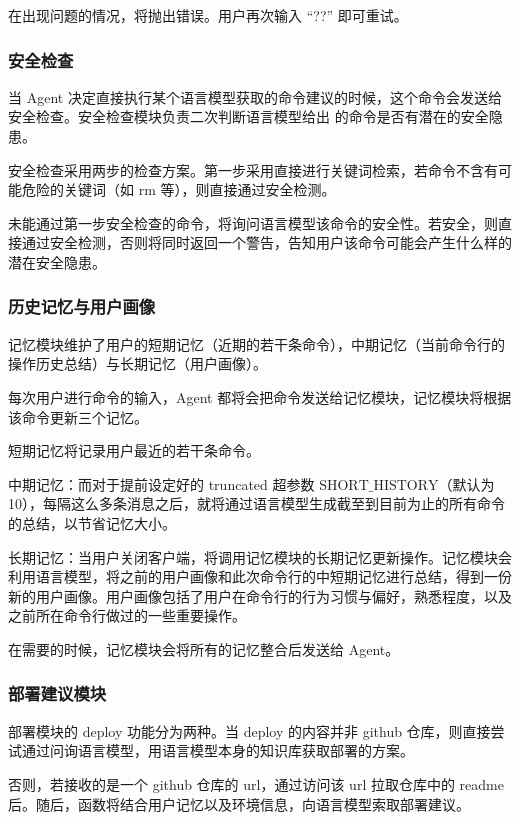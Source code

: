 \documentclass{article}
\theoremstyle{plain}
\theoremstyle{definition}
\theoremstyle{remark}
\begin{document}
在出现问题的情况，将抛出错误。用户再次输入 “??” 即可重试。

\subsubsection{安全检查}

当 Agent 决定直接执行某个语言模型获取的命令建议的时候，这个命令会发送给安全检查。安全检查模块负责二次判断语言模型给出 的命令是否有潜在的安全隐患。

安全检查采用两步的检查方案。第一步采用直接进行关键词检索，若命令不含有可能危险的关键词（如 rm 等），则直接通过安全检测。

未能通过第一步安全检查的命令，将询问语言模型该命令的安全性。若安全，则直接通过安全检测，否则将同时返回一个警告，告知用户该命令可能会产生什么样的潜在安全隐患。

\subsubsection{历史记忆与用户画像}

记忆模块维护了用户的短期记忆（近期的若干条命令），中期记忆（当前命令行的操作历史总结）与长期记忆（用户画像）。

每次用户进行命令的输入，Agent 都将会把命令发送给记忆模块，记忆模块将根据该命令更新三个记忆。

短期记忆将记录用户最近的若干条命令。

中期记忆：而对于提前设定好的 truncated 超参数 $\text{SHORT\_HISTORY}$（默认为 10），每隔这么多条消息之后，就将通过语言模型生成截至到目前为止的所有命令的总结，以节省记忆大小。

长期记忆：当用户关闭客户端，将调用记忆模块的长期记忆更新操作。记忆模块会利用语言模型，将之前的用户画像和此次命令行的中短期记忆进行总结，得到一份新的用户画像。用户画像包括了用户在命令行的行为习惯与偏好，熟悉程度，以及之前所在命令行做过的一些重要操作。

在需要的时候，记忆模块会将所有的记忆整合后发送给 Agent。

\subsubsection{部署建议模块}

部署模块的 deploy 功能分为两种。当 deploy 的内容并非 github 仓库，则直接尝试通过问询语言模型，用语言模型本身的知识库获取部署的方案。

否则，若接收的是一个 github 仓库的 url，通过访问该 url 拉取仓库中的 readme 后。随后，函数将结合用户记忆以及环境信息，向语言模型索取部署建议。
\end{document}
